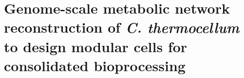 \chapter{Genome-scale metabolic network reconstruction of \textit{C. thermocellum} to design modular cells for consolidated bioprocessing} \label{ch:gem}
